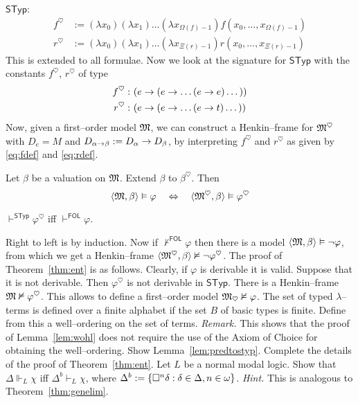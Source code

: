 $\mathsf{STyp}$:
\begin{subequations}
\begin{align}
\label{eq:fdef}
f^{\heartsuit} & := (\lambda x_0)(\lambda x_1)\dotso
	(\lambda x_{\Omega(f)-1})f(x_0, \dotsc, x_{\Omega(f)-1}) \\
\label{eq:rdef}
r^{\heartsuit} & := (\lambda x_0)(\lambda x_1)\dotso
	(\lambda x_{\Xi(r)-1})r(x_0, \dotsc, x_{\Xi(r)-1}) 
\end{align}
\end{subequations}
This is extended to all formulae. Now we look at the signature for 
$\mathsf{STyp}$ with the constants $f^{\heartsuit}$, $r^{\heartsuit}$ 
of type 
\begin{subequations}
\begin{align}
f^{\heartsuit} : & \ (e \rightarrow (e \rightarrow \dotso (e \rightarrow e) \dotso )) \\
r^{\heartsuit} : & \ (e \rightarrow (e \rightarrow \dotso (e \rightarrow t) \dotso )) 
\end{align}
\end{subequations}
Now, given a first--order model $\mathfrak{M}$, we can construct a Henkin--frame 
for $\mathfrak{M}^{\heartsuit}$ with $D_e = M$ and $D_{\alpha\rightarrow\beta} 
:= D_{\alpha} \rightarrow D_{\beta}$, by interpreting $f^{\heartsuit}$ 
and $r^{\heartsuit}$ as given by \eqref{eq:fdef} and \eqref{eq:rdef}.
\begin{lem}
\label{lem:predtostyp}
Let $\beta$ be a valuation on $\mathfrak{M}$. Extend $\beta$ to 
$\beta^{\heartsuit}$. Then
\begin{equation}
\langle \mathfrak{M}, \beta\rangle \vDash \varphi \quad\Leftrightarrow\quad
\langle \mathfrak{M}^{\heartsuit}, \beta\rangle \vDash \varphi^{\heartsuit}
\end{equation}
\end{lem}
\begin{lem}
\label{lem:pred}
$\vdash^{\mathsf{STyp}} \varphi^{\heartsuit}$ iff 
$\vdash^{\mathsf{FOL}} \varphi$.
\end{lem}
Right to left is by induction. Now if $\nvdash^{\mathsf{FOL}}
\varphi$ then there is a model $\langle \mathfrak{M}, \beta\rangle \vDash 
\neg \varphi$, from which we get a Henkin--frame 
$\langle \mathfrak{M}^{\heartsuit}, \beta\rangle \nvDash \neg \varphi^{\heartsuit}$.
The proof of Theorem~\ref{thm:ent} is as follows. Clearly, if
$\varphi$ is derivable it is valid. Suppose that it is not 
derivable. Then $\varphi^{\heartsuit}$ is not derivable   
in $\mathsf{STyp}$. There is a Henkin--frame $\mathfrak{M} \nvDash 
\varphi^{\heartsuit}$. This allows to define a first--order model 
$\mathfrak{M}_{\heartsuit} \nvDash \varphi$.
\vplatz
\exercise
The set of typed $\lambda$--terms is defined over a finite alphabet 
if the set $B$ of basic types is finite. Define from this a 
well--ordering on the set of terms. {\it Remark.} This shows 
that the proof of Lemma~\ref{lem:wohl} does not require the 
use of the Axiom of Choice for obtaining the well--ordering.
\vplatz
\exercise
Show Lemma~\ref{lem:predtostyp}.
\vplatz
\exercise
Complete the details of the proof of Theorem~\ref{thm:ent}. 
\vplatz
\exercise
Let $L$ be a normal modal logic. Show that $\Delta \Vdash_L \chi$ 
iff $\Delta^b \vdash_L \chi$, where $\Delta^b := \{\square^n \delta : 
\delta \in \Delta, n \in \omega\}$. {\it Hint.} This is analogous 
to Theorem~\ref{thm:genelim}.
